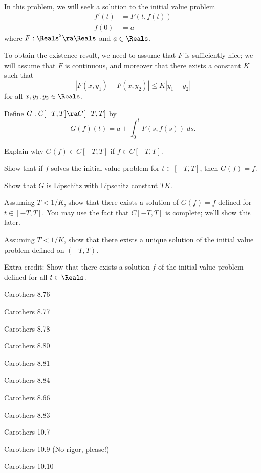 \documentclass[minion]{homework}
\begin{document}
\begin{aproblems}

\hproblem 
In this problem, we will seek a solution to the initial value problem
\begin{align*}
f'(t) &= F(t,f(t))\\
f(0) &= a
\end{align*}
where $F:\Reals^2\ra \Reals$ and $a\in\Reals$.

To obtain the existence result, we need to assume that $F$ is sufficiently nice;
we will assume that $F$ is continuous, and moreover that there exists a constant $K$
such that
$$
|F(x,y_1)-F(x,y_2)|\le K |y_1-y_2|
$$
for all $x,y_1,y_2\in\Reals$.

Define $G:C[-T,T]\ra C[-T,T]$ by
$$
G(f)(t) = a + \int_0^t F(s,f(s))\; ds.
$$

\begin{subproblems}
\item Explain why $G(f)\in C[-T,T]$ if $f\in C[-T,T]$.
\item Show that if $f$ solves the initial value problem for $t\in[-T,T]$, then $G(f)=f$.
\item Show that $G$ is Lipschitz with Lipschitz constant $TK$.
\item Assuming $T<1/K$, show that there exists a solution of $G(f)=f$
defined for $t\in [-T,T]$.
You may use the fact that $C[-T,T]$ is complete; we'll show this later.
\item Assuming $T<1/K$, show that there exists a unique solution
of the initial value problem defined on $(-T,T)$.
\item Extra credit:  Show that there exists a solution $f$ of the initial value problem
defined for all $t\in\Reals$.
\end{subproblems}

\hproblem Carothers 8.76

\hproblem Carothers 8.77

\hproblem Carothers 8.78

\hproblem Carothers 8.80

\hproblem Carothers 8.81

\hproblem Carothers 8.84

\hproblem Carothers 8.66

\hproblem Carothers 8.83

\hproblem Carothers  10.7

\hproblem Carothers  10.9 (No rigor, please!)

\hproblem Carothers  10.10


\end{aproblems}
\end{document}
